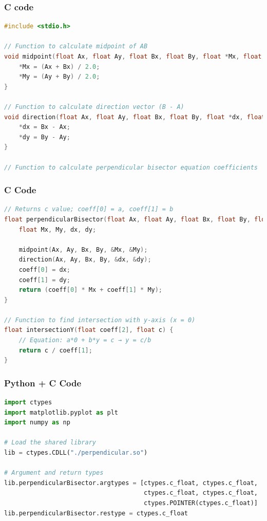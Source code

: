 \documentclass{beamer}
\begin{document}
\begin{frame}[fragile]
\frametitle{C code}
    \begin{lstlisting}[language=C]
#include <stdio.h>

// Function to calculate midpoint of AB
void midpoint(float Ax, float Ay, float Bx, float By, float *Mx, float *My) {
    *Mx = (Ax + Bx) / 2.0;
    *My = (Ay + By) / 2.0;
}

// Function to calculate direction vector (B - A)
void direction(float Ax, float Ay, float Bx, float By, float *dx, float *dy) {
    *dx = Bx - Ax;
    *dy = By - Ay;
}

// Function to calculate perpendicular bisector equation coefficients
\end{lstlisting}
\end{frame}
\begin{frame}[fragile]
    \frametitle{C Code }
    \begin{lstlisting}[language=C]
// Returns c value; coeff[0] = a, coeff[1] = b
float perpendicularBisector(float Ax, float Ay, float Bx, float By, float coeff[2]) {
    float Mx, My, dx, dy;

    midpoint(Ax, Ay, Bx, By, &Mx, &My);
    direction(Ax, Ay, Bx, By, &dx, &dy);
    coeff[0] = dx;
    coeff[1] = dy;
    return (coeff[0] * Mx + coeff[1] * My);
}

// Function to find intersection with y-axis (x = 0)
float intersectionY(float coeff[2], float c) {
    // Equation: a*0 + b*y = c → y = c/b
    return c / coeff[1];
}
     \end{lstlisting}
\end{frame}
\begin{frame}[fragile]
    \frametitle{Python + C Code }
    \begin{lstlisting}[language=Python]
import ctypes
import matplotlib.pyplot as plt
import numpy as np

# Load the shared library
lib = ctypes.CDLL("./perpendicular.so")

# Argument and return types
lib.perpendicularBisector.argtypes = [ctypes.c_float, ctypes.c_float,
                                      ctypes.c_float, ctypes.c_float,
                                      ctypes.POINTER(ctypes.c_float)]
lib.perpendicularBisector.restype = ctypes.c_float

    \end{lstlisting}
\end{frame}
\end{document}
